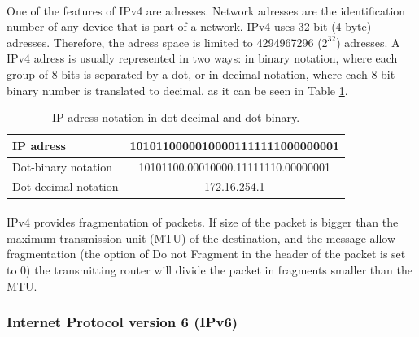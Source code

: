 \paragraph{}One of the features of IPv4 are adresses. Network adresses are the identification number of any device that is part of a network. IPv4 uses 32-bit (4 byte) adresses. Therefore, the adress space is limited to 4294967296 ($2^{32}$) adresses. A IPv4 adress is usually represented in two ways: in binary notation, where each group of 8 bits is separated by a dot, or in decimal notation, where each 8-bit binary number is translated to decimal, as it can be seen in Table \ref{table:IPadress}.
\begin{table}[H]
\begin{center}
\begin{tabular}{|l|c|}
\hline 
IP adress & 10101100000100001111111000000001 \\ 
\hline 
Dot-binary notation & 10101100.00010000.11111110.00000001 \\ 
\hline 
Dot-decimal notation & 172.16.254.1 \\ 
\hline
\end{tabular}
\end{center}
\caption[IP adress notation]{IP adress notation in dot-decimal and dot-binary.}
\label{table:IPadress}
\end{table}
\paragraph{}IPv4 provides fragmentation of packets. If size of the packet is bigger than the maximum transmission unit (MTU) of the destination, and the message allow fragmentation (the option of Do not Fragment in the header of the packet is set to 0) the transmitting router will divide the packet in fragments smaller than the MTU.

\subsubsection{Internet Protocol version 6 (IPv6)\cite{IPv6}}
